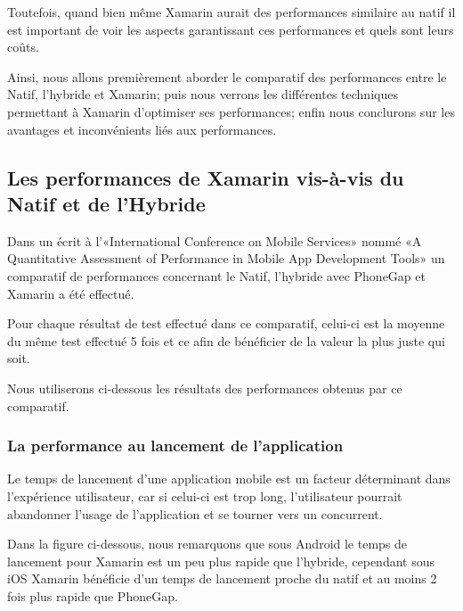 \documentclass[11]{article}
\begin{document}
  \vspace{0.5cm}
 
Toutefois, quand bien même Xamarin aurait des performances similaire au natif il est important de voir les aspects garantissant ces performances et quels sont leurs coûts.
 
  \vspace{0.5cm}
 
Ainsi, nous allons premièrement aborder le comparatif des performances entre le Natif, l’hybride et Xamarin; puis nous verrons les différentes techniques permettant à Xamarin d’optimiser ses performances; enfin nous conclurons sur les avantages et inconvénients liés aux performances. 

  \subsection{Les performances de Xamarin vis-à-vis du Natif et de l’Hybride}
 
 Dans un écrit à l’«International Conference on Mobile Services» nommé «A Quantitative Assessment of Performance in Mobile App Development Tools» un comparatif de performances concernant le Natif, l’hybride avec PhoneGap et Xamarin a été effectué.
 
 
   \vspace{0.5cm}
   
   
Pour chaque résultat de test effectué dans ce comparatif, celui-ci est la moyenne du même test effectué 5 fois et ce afin de bénéficier de la valeur la plus juste qui soit. 

   \vspace{0.5cm}
   
Nous utiliserons ci-dessous les résultats des performances obtenus par ce comparatif.

   \subsubsection{La performance au lancement de l’application}
   
 Le temps de lancement d’une application mobile est un facteur déterminant dans l’expérience utilisateur, car si celui-ci est trop long, l’utilisateur pourrait abandonner l’usage de l’application et se tourner vers un concurrent.
 
   \vspace{0.5cm}
   
Dans la figure ci-dessous, nous remarquons que sous Android le temps de lancement pour Xamarin est un peu plus rapide que l’hybride, cependant sous iOS Xamarin bénéficie d’un temps de lancement proche du natif et au moins 2 fois plus rapide que PhoneGap.
\end{document}
